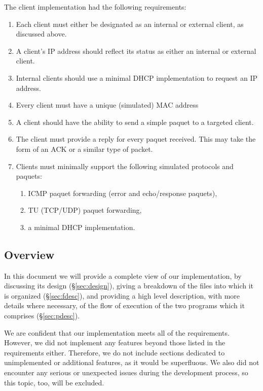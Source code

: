 \documentclass[10pt, a4paper]{article}
\begin{document}
The client implementation had the following requirements:
\begin{enumerate}
  \item Each client must either be designated as an internal or external client,
    as discussed above.
  \item A client's IP address should reflect its status as either an internal or
    external client.
  \item Internal clients should use a minimal DHCP implementation to request an
    IP address.
  \item Every client must have a unique (simulated) MAC address
  \item A client should have the ability to send a simple paquet to a targeted
    client.
  \item The client must provide a reply for every paquet received. This may take
    the form of an ACK or a similar type of packet.
  \item Clients must minimally support the following simulated protocols and
    paquets:
  \begin{enumerate}
    \item ICMP paquet forwarding (error and echo/response paquets),
    \item TU (TCP/UDP) paquet forwarding,
    \item a minimal DHCP implementation.
  \end{enumerate}
\end{enumerate}


\subsection{Overview}
\label{ssec:oview}

In this document we will provide a complete view of our implementation, by
discussing its design (\S\ref{sec:design}), giving a breakdown of the files into
which it is organized (\S\ref{sec:fdesc}), and providing a high level
description, with more details where necessary, of the flow of execution of the
two programs which it comprises (\S\ref{sec:pdesc}).

We are confident that our implementation meets all of the requirements. However,
we did not implement any features beyond those listed in the requirements
either. Therefore, we do not include sections dedicated to unimplemented or
additional features, as it would be superfluous. We also did not encounter any
serious or unexpected issues during the development process, so this topic, too,
will be excluded.
\end{document}
